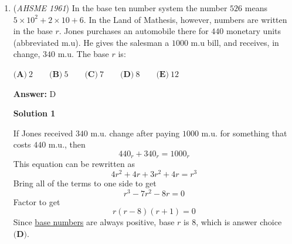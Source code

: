 \begin{enumerate}
 \textbf{Answer: }E



\textbf{Solution 1}

Let $x$ be the value reduced from the base.  Using the variables from the problem, the equation to solve is
 \[\frac{1}{2} (h + m)(b - x) = \frac{1}{2} \cdot \frac{bh}{2}\]Dividing both sides by $\frac{1}{2}$ and $h+m$ results in
 \[b - x = \frac{bh}{2(h+m)}\]
 \[-x = \frac{bh}{2(h+m)} - b\]
 \[x = b - \frac{bh}{2(h+m)}\]The right side can be written as a single fraction by giving $b$ a common denominator.
 \[x = \frac{2bh + 2bm}{2(h+m)} - \frac{bh}{2(h+m)}\]
 \[x = \frac{bh + 2bm}{2(h+m)}\]
 \[x = \frac{b(2m+h)}{2(h+m)}\]The answer is $\boxed{\textbf{(E)}}$.

 



\textbf{Solution 2}

<i>By Ajeet Dubey | \href{https://ioqm.in}{ioqm.in}</i>

 The original area is $bh/2$. After the altitude is increased by $m$ and the base is reduced by $d$, the new area is$\frac12(b-d)(h+m).$This is half the original area, so$\frac12(b-d)(h+m)=\frac14bh.$Thus$2(b-d)(h+m)=bh,$which gives$d=b-\frac{bh}{2(h+m)}=\frac{b(h+2m)}{2(h+m)}.$

 Thus the answer is $\boxed{\textbf{(E)}}$.

 


	\item (\textit{AHSME 1961}) In the base ten number system the number $526$ means $5 \times 10^2+2 \times 10 + 6$. 
In the Land of Mathesis, however, numbers are written in the base $r$. 
Jones purchases an automobile there for $440$ monetary units (abbreviated m.u). 
He gives the salesman a $1000$ m.u bill, and receives, in change, $340$ m.u. The base $r$ is:


 $\textbf{(A)}\ 2\qquad \textbf{(B)}\ 5\qquad \textbf{(C)}\ 7\qquad \textbf{(D)}\ 8\qquad \textbf{(E)}\ 12$

 \textbf{Answer: }D



\textbf{Solution 1}

If Jones received $340$ m.u. change after paying $1000$ m.u. for something that costs $440$ m.u., then
 \[440_r + 340_r = 1000_r\]This equation can be rewritten as
 \[4r^2 + 4r + 3r^2 + 4r = r^3\]Bring all of the terms to one side to get
 \[r^3 - 7r^2 - 8r = 0\]Factor to get
 \[r(r-8)(r+1)=0\]Since \href{https://artofproblemsolving.com/wiki/index.php?title=Base\_numbers}{base numbers} are always positive, base $r$ is $8$, which is answer choice $\boxed{\textbf{(D)}}$.


\end{enumerate}
